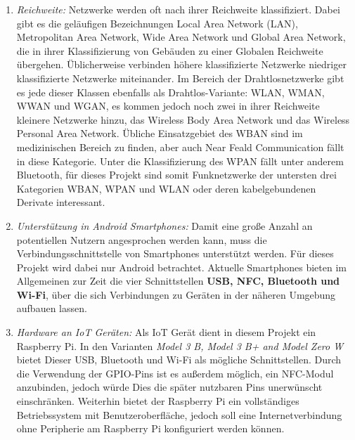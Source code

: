     \begin {enumerate}
    \item {\it Reichweite:}
    Netzwerke werden oft nach ihrer Reichweite klassifiziert. Dabei gibt es die geläufigen Bezeichnungen Local Area Network (LAN),
    Metropolitan Area Network, Wide Area Network und Global Area Network, die in ihrer Klassifizierung von Gebäuden zu einer Globalen Reichweite übergehen.
    Üblicherweise verbinden höhere klassifizierte Netzwerke niedriger klassifizierte Netzwerke miteinander. Im Bereich der Drahtlosnetzwerke gibt es jede
    dieser Klassen ebenfalls als Drahtlos-Variante: WLAN, WMAN, WWAN und WGAN, es kommen jedoch noch zwei in ihrer Reichweite kleinere Netzwerke hinzu,
    das Wireless Body Area Network und das Wireless Personal Area Network. Übliche Einsatzgebiet des WBAN sind im medizinischen Bereich zu finden,
    aber auch Near Feald Communication fällt in diese Kategorie. Unter die Klassifizierung des WPAN fällt unter anderem Bluetooth,
    für dieses Projekt sind somit Funknetzwerke der untersten drei Kategorien WBAN, WPAN und WLAN oder deren kabelgebundenen Derivate interessant.\cite[S.17]{Lueders}
    \item {\it Unterstützung in Android Smartphones:}
    Damit eine große Anzahl an potentiellen Nutzern angesprochen werden kann, muss die Verbindungsschnittstelle von Smartphones unterstützt werden.
    Für dieses Projekt wird dabei nur Android betrachtet.
    Aktuelle Smartphones bieten im Allgemeinen zur Zeit die vier Schnittstellen {\bf USB, NFC, Bluetooth und Wi-Fi},
    über die sich Verbindungen zu Geräten in der näheren Umgebung aufbauen lassen.
    \item {\it Hardware an IoT Geräten:}
    Als IoT Gerät dient in diesem Projekt ein Raspberry Pi.
    In den Varianten {\it Model 3 B, Model 3 B+ and Model Zero W} bietet Dieser USB, Bluetooth und Wi-Fi als mögliche Schnittstellen.
    Durch die Verwendung der GPIO-Pins ist es außerdem möglich, ein NFC-Modul anzubinden,
    jedoch würde Dies die später nutzbaren Pins unerwünscht einschränken.
    Weiterhin bietet der Raspberry Pi ein vollständiges Betriebssystem mit Benutzeroberfläche, jedoch soll eine Internetverbindung
    ohne Peripherie am Raspberry Pi konfiguriert werden können. 
    \end {enumerate}

